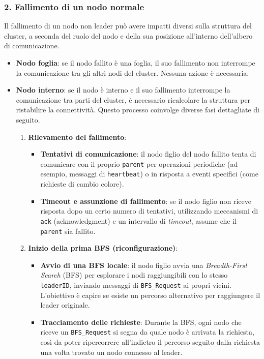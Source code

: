 \documentclass[12pt, a4paper]{report}
\begin{document}
\subsubsection{2. Fallimento di un nodo normale}
\label{subsubsec:fallimento_nodo_normale}
Il fallimento di un nodo non leader pu\`o avere impatti diversi sulla struttura del cluster, a seconda del ruolo del nodo e della sua posizione all'interno dell'albero di comunicazione.

\begin{itemize}
    \item \textbf{Nodo foglia}: se il nodo fallito \`e una foglia, il suo fallimento non interrompe la comunicazione tra gli altri nodi del cluster. Nessuna azione \`e necessaria.
    
    \item \textbf{Nodo interno}: se il nodo \`e interno e il suo fallimento interrompe la comunicazione tra parti del cluster, \`e necessario ricalcolare la struttura per ristabilire la connettivit\`a. Questo processo coinvolge diverse fasi dettagliate di seguito.

    \newpage
    \begin{enumerate}
        \item \textbf{Rilevamento del fallimento}:
        \begin{itemize}
            \item \textbf{Tentativi di comunicazione}: il nodo figlio del nodo fallito tenta di comunicare con il proprio \texttt{parent} per operazioni periodiche (ad esempio, messaggi di \texttt{heartbeat}) o in risposta a eventi specifici (come richieste di cambio colore).
            \item \textbf{Timeout e assunzione di fallimento}: se il nodo figlio non riceve risposta dopo un certo numero di tentativi, utilizzando meccanismi di \texttt{ack} (acknowledgment) e un intervallo di \textit{timeout}, assume che il \texttt{parent} sia fallito.
        \end{itemize}
        
        \item \textbf{Inizio della prima BFS (riconfigurazione)}:
        \begin{itemize}
            \item \textbf{Avvio di una BFS locale}: il nodo figlio avvia una \textit{Breadth-First Search} (BFS) per esplorare i nodi raggiungibili con lo stesso \texttt{leaderID}, inviando messaggi di \texttt{BFS\_Request} ai propri vicini. L'obiettivo \`e capire se esiste un percorso alternativo per raggiungere il leader originale.
            \item \textbf{Tracciamento delle richieste}: Durante la BFS, ogni nodo che riceve un \texttt{BFS\_Request} si segna da quale nodo \`e arrivata la richiesta, così da poter ripercorrere all'indietro il percorso seguito dalla richiesta una volta trovato un nodo connesso al leader.
        \end{itemize}
        

\end{enumerate}
\end{itemize}
\end{document}
